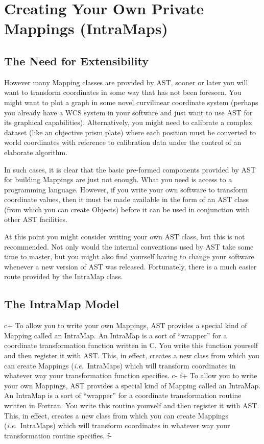 \documentclass[twoside,11pt]{article}
\begin{document}
\cleardoublepage
\section{\label{ss:intramaps}Creating Your Own Private Mappings (IntraMaps)}

\subsection{The Need for Extensibility}

However many Mapping classes are provided by AST, sooner or later you
will want to transform coordinates in some way that has not been
foreseen. You might want to plot a graph in some novel curvilinear
coordinate system (perhaps you already have a WCS system in your
software and just want to use AST for its graphical capabilities).
Alternatively, you might need to calibrate a complex dataset (like an
objective prism plate) where each position must be converted to world
coordinates with reference to calibration data under the control of an
elaborate algorithm.

In such cases, it is clear that the basic pre-formed components
provided by AST for building Mappings are just not enough. What you
need is access to a programming language. However, if you write your
own software to transform coordinate values, then it must be made
available in the form of an AST class (from which you can create
Objects) before it can be used in conjunction with other AST
facilities.

At this point you might consider writing your own AST class, but this
is not recommended. Not only would the internal conventions used by
AST take some time to master, but you might also find yourself having
to change your software whenever a new version of AST was
released. Fortunately, there is a much easier route provided by the
IntraMap class.

\subsection{The IntraMap Model}

c+
To allow you to write your own Mappings, AST provides a special kind
of Mapping called an IntraMap. An IntraMap is a sort of ``wrapper''
for a coordinate transformation function written in C. You write this
function yourself and then register it with AST. This, in effect,
creates a new class from which you can create Mappings
({\em{i.e.}}\ IntraMaps) which will transform coordinates in whatever
way your transformation function specifies.
c-
f+
To allow you to write your own Mappings, AST provides a special kind
of Mapping called an IntraMap. An IntraMap is a sort of ``wrapper''
for a coordinate transformation routine written in Fortran. You write
this routine yourself and then register it with AST. This, in effect,
creates a new class from which you can create Mappings
({\em{i.e.}}\ IntraMaps) which will transform coordinates in whatever
way your transformation routine specifies.
f-
\end{document}
